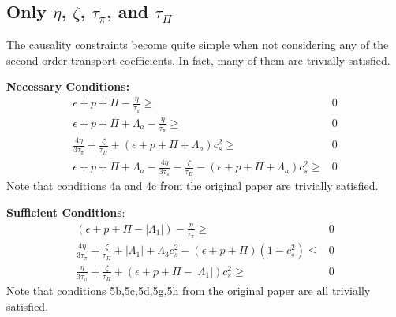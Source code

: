 \documentclass{article}
\begin{document}
\subsection{Only $\eta$, $\zeta$, $\tau_\pi$, and $\tau_\Pi$}
The causality constraints become quite simple when not considering any of the second order transport coefficients. In fact, many of them are trivially satisfied.

\textbf{Necessary Conditions:}
\begin{align}
    \epsilon + p + \Pi - \frac{\eta}{\tau_\pi} \geq& 0\\
    \epsilon + p + \Pi + \Lambda_a - \frac{\eta}{\tau_\pi} \geq& 0\\
    \frac{4\eta}{3\tau_\pi} + \frac{\zeta}{\tau_\Pi} + \left(\epsilon + p + \Pi + \Lambda_a \right)c_s^2 \geq& 0\\
    \epsilon + p + \Pi + \Lambda_a - \frac{4\eta}{3\tau_\pi} - \frac{\zeta}{\tau_\Pi} - \left(\epsilon + p + \Pi + \Lambda_a \right)c_s^2 \geq& 0
\end{align}
Note that conditions 4a and 4c from the original paper are trivially satisfied.


\textbf{Sufficient Conditions}:
\begin{align}
    \left( \epsilon + p + \Pi - |\Lambda_1| \right) - \frac{\eta}{\tau_\pi} \geq& 0\\
    \frac{4\eta}{3\tau_\pi} + \frac{\zeta}{\tau_\Pi} + |\Lambda_1| + \Lambda_3 c_s^2 - \left( \epsilon + p + \Pi \right)\left( 1 - c_s^2 \right) \leq& 0\\
    \frac{\eta}{3\tau_\pi} + \frac{\zeta}{\tau_\Pi} + \left(\epsilon + p + \Pi - |\Lambda_1| \right)c_s^2 \geq& 0
\end{align}
Note that conditions 5b,5c,5d,5g,5h from the original paper are all trivially satisfied.
\end{document}
